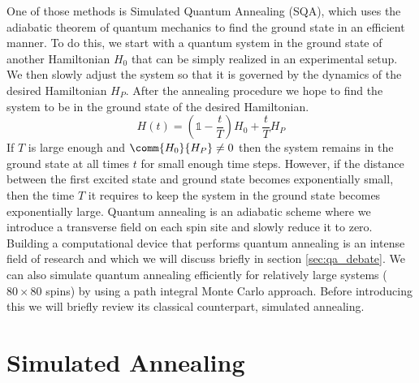 One of those methods is Simulated Quantum Annealing (SQA), which uses the adiabatic theorem of quantum mechanics to find the ground state in an efficient manner. To do this, we start with a quantum system in the ground state of another Hamiltonian $H_0$ that can be simply realized in an experimental setup. We then slowly adjust the system so that it is governed by the dynamics of the desired Hamiltonian $H_P$. After the annealing procedure we hope to find the system to be in the ground state of the desired Hamiltonian.
\begin{equation*}
    H(t) = \left(\mathbb{1} - \frac{t}{T} \right) H_0 +  \frac{t}{T} H_P
\end{equation*}
If $T$ is large enough and $\comm{H_0}{H_P}\neq0$ then the system remains in the ground state at all times $t$ for small enough time steps. However, if the distance between the first excited state and ground state becomes exponentially small, then the time $T$ it requires to keep the system in the ground state becomes exponentially large. Quantum annealing is an adiabatic scheme where we introduce a transverse field on each spin site and slowly reduce it to zero. Building a computational device that performs quantum annealing is an intense field of research and which we will discuss briefly in section \ref{sec:qa_debate}. We can also simulate quantum annealing efficiently for relatively large systems ($80\times80$ spins) by using a path integral Monte Carlo approach. Before introducing this we will briefly review its classical counterpart, simulated annealing.

\section{Simulated Annealing}

